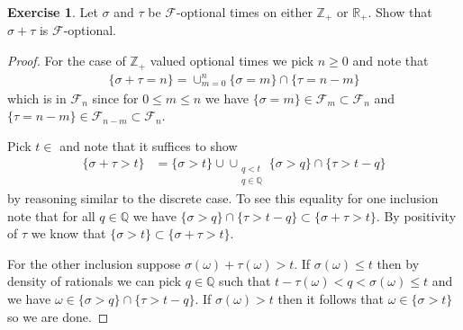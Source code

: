 \documentclass{amsbook}
\theoremstyle{definition}
\newtheorem{xca}{Exercise}
\theoremstyle{remark}
\newcommand{\reals}{\mathbb{R}}
\newcommand{\rationals}{\mathbb{Q}}
\newcommand{\integers}{\mathbb{Z}}
\begin{document}
\begin{xca}\label{SumOfOptionalTimes}Let $\sigma$ and $\tau$ be $\mathcal{F}$-optional times on
  either $\integers_+$ or $\reals_+$.
  Show that $\sigma + \tau$ is $\mathcal{F}$-optional.
\end{xca}
\begin{proof}
For the case of $\integers_+$ valued optional times we pick $n \geq 0$
and note that
\begin{align*}
\lbrace \sigma + \tau = n \rbrace = \cup_{m=0}^n \lbrace \sigma = m
\rbrace \cap \lbrace \tau = n-m \rbrace
\end{align*}
which is in $\mathcal{F}_n$ since for $0 \leq m \leq n$ we have
$\lbrace \sigma = m \rbrace \in \mathcal{F}_m \subset \mathcal{F}_n$
and $\lbrace \tau = n - m \rbrace \in \mathcal{F}_{n-m} \subset
\mathcal{F}_n$.

Pick $t \in $ and note that it suffices to show
\begin{align*}
\lbrace \sigma + \tau > t \rbrace &= \lbrace \sigma > t \rbrace \cup \cup_{\substack{q < t \\ q \in
    \rationals}} \lbrace \sigma > q \rbrace \cap \lbrace \tau > t - q \rbrace
\end{align*}
by reasoning similar to the discrete case.  To see this equality for
one inclusion note
that for all $q \in \rationals$ we have $\lbrace \sigma > q \rbrace
\cap \lbrace \tau > t - q \rbrace \subset \lbrace \sigma + \tau > t
\rbrace$.  By positivity of $\tau$ we know that $ \lbrace \sigma > t
\rbrace \subset \lbrace \sigma + \tau > t \rbrace $.

For the other inclusion suppose $\sigma(\omega) + \tau(\omega) > t$.
If $\sigma(\omega) \leq t$ then by density of rationals we can pick $q \in
\rationals$ such that $t - \tau(\omega) < q < \sigma(\omega) \leq t$ and
we have $\omega \in \lbrace \sigma > q \rbrace \cap \lbrace \tau > t -
q\rbrace$.  If $\sigma(\omega) > t$ then it follows that $\omega \in
\lbrace \sigma > t \rbrace$ so we are done.
\end{proof}
\end{document}
